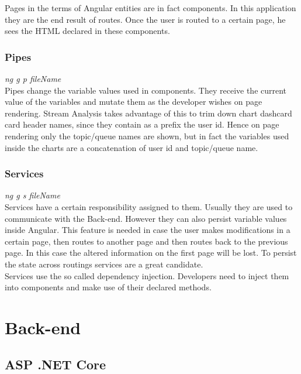 Pages in the terms of Angular entities are in fact components. In this application they are the end result of routes. Once the user is routed to a certain page, he sees the HTML declared in these components.

\subsubsection{Pipes}
\label{chap:04:01:02:05}

\textit{ng g p fileName}\\

Pipes change the variable values used in components. They receive the current value of the variables and mutate them as the developer wishes on page rendering. Stream Analysis takes advantage of this to trim down chart dashcard card header names, since they contain as a prefix the user id. Hence on page rendering only the topic/queue names are shown, but in fact the variables used inside the charts are a concatenation of user id and topic/queue name.

\subsubsection{Services}
\label{chap:04:01:02:06}

\textit{ng g s fileName}\\

Services have a certain responsibility assigned to them. Usually they are used to communicate with the Back-end. However they can also persist variable values inside Angular. This feature is needed in case the user makes modifications in a certain page, then routes to another page and then routes back to the previous page. In this case the altered information on the first page will be lost. To persist the state across routings services are a great candidate.\\

Services use the so called dependency injection. Developers need to inject them into components and make use of their declared methods. \\

\section{Back-end}
\label{chap:04:02}

\subsection{ASP .NET Core}
\label{chap:04:02:01}

